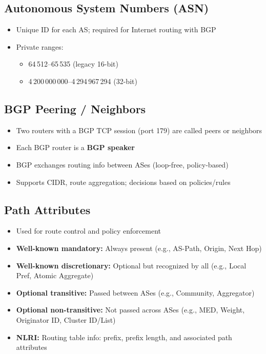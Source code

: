 \begin{multicols*}{5}
		\subsection{Autonomous System Numbers (ASN)}
		\begin{itemize}
			\item Unique ID for each AS; required for Internet routing with BGP
			\item Private ranges:
			\begin{itemize}
				\item 64\,512–65\,535 (legacy 16-bit)
				\item 4\,200\,000\,000–4\,294\,967\,294 (32-bit)
			\end{itemize}
		\end{itemize}
		
		\subsection{BGP Peering / Neighbors}
		\begin{itemize}
			\item Two routers with a BGP TCP session (port 179) are called peers or neighbors
			\item Each BGP router is a \textbf{BGP speaker}
			\item BGP exchanges routing info between ASes (loop-free, policy-based)
			\item Supports CIDR, route aggregation; decisions based on policies/rules
		\end{itemize}
		
		\subsection{Path Attributes}
		\begin{itemize}
			\item Used for route control and policy enforcement
			\item \textbf{Well-known mandatory:} Always present (e.g., AS-Path, Origin, Next Hop)
			\item \textbf{Well-known discretionary:} Optional but recognized by all (e.g., Local Pref, Atomic Aggregate)
			\item \textbf{Optional transitive:} Passed between ASes (e.g., Community, Aggregator)
			\item \textbf{Optional non-transitive:} Not passed across ASes (e.g., MED, Weight, Originator ID, Cluster ID/List)
			\item \textbf{NLRI:} Routing table info: prefix, prefix length, and associated path attributes
		\end{itemize}
		

\end{multicols*}
